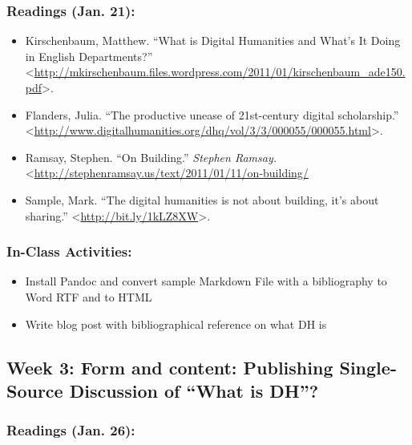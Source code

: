 \documentclass[]{article}
\begin{document}
\subsubsection{Readings (Jan. 21):}\label{readings-jan.-21}

\begin{itemize}
\itemsep1pt\parskip0pt
\item
  Kirschenbaum, Matthew. ``What is Digital Humanities and What's It
  Doing in English Departments?''
  \textless{}\url{http://mkirschenbaum.files.wordpress.com/2011/01/kirschenbaum_ade150.pdf}\textgreater{}.
\item
  Flanders, Julia. ``The productive unease of 21st-century digital
  scholarship.''
  \textless{}\url{http://www.digitalhumanities.org/dhq/vol/3/3/000055/000055.html}\textgreater{}.
\item
  Ramsay, Stephen. ``On Building.'' \emph{Stephen Ramsay.}
  \textless{}\url{http://stephenramsay.us/text/2011/01/11/on-building/}
\item
  Sample, Mark. ``The digital humanities is not about building, it's
  about sharing.'' \textless{}\url{http://bit.ly/1kLZ8XW}\textgreater{}.
\end{itemize}

\subsubsection{In-Class Activities:}\label{in-class-activities}

\begin{itemize}
\itemsep1pt\parskip0pt
\item
  Install Pandoc and convert sample Markdown File with a bibliography to
  Word RTF and to HTML
\item
  Write blog post with bibliographical reference on what DH is
\end{itemize}

\subsection{Week 3: Form and content: Publishing Single-Source
Discussion of ``What is
DH''?}\label{week-3-form-and-content-publishing-single-source-discussion-of-what-is-dh}

\subsubsection{Readings (Jan. 26):}\label{readings-jan.-26}
\end{document}
